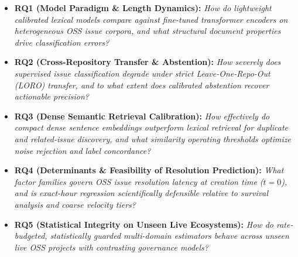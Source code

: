 \documentclass[conference]{IEEEtran}
\begin{document}
\begin{itemize}
    \item \textbf{RQ1 (Model Paradigm \& Length Dynamics):} \emph{How do lightweight calibrated lexical models compare against fine-tuned transformer encoders on heterogeneous OSS issue corpora, and what structural document properties drive classification errors?}
    \item \textbf{RQ2 (Cross-Repository Transfer \& Abstention):} \emph{How severely does supervised issue classification degrade under strict Leave-One-Repo-Out (LORO) transfer, and to what extent does calibrated abstention recover actionable precision?}
    \item \textbf{RQ3 (Dense Semantic Retrieval Calibration):} \emph{How effectively do compact dense sentence embeddings outperform lexical retrieval for duplicate and related-issue discovery, and what similarity operating thresholds optimize noise rejection and label concordance?}
    \item \textbf{RQ4 (Determinants \& Feasibility of Resolution Prediction):} \emph{What factor families govern OSS issue resolution latency at creation time ($t=0$), and is exact-hour regression scientifically defensible relative to survival analysis and coarse velocity tiers?}
    \item \textbf{RQ5 (Statistical Integrity on Unseen Live Ecosystems):} \emph{How do rate-budgeted, statistically guarded multi-domain estimators behave across unseen live OSS projects with contrasting governance models?}
\end{itemize}
\end{document}
